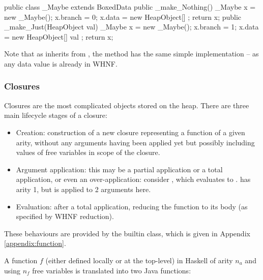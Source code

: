 \documentclass[dissertation.tex]{subfiles}
\begin{document}
{{{            \begin{javafigure}
            public class _Maybe extends BoxedData {
                public _make_Nothing() {
                    _Maybe x = new _Maybe();
                    x.branch = 0;
                    x.data = new HeapObject[] {};
                    return x;
                }
                public _make_Just(HeapObject val) {
                    _Maybe x = new _Maybe();
                    x.branch = 1;
                    x.data = new HeapObject[] { val };
                    return x;
                }
            }
            \end{javafigure}

            Note that as  inherits from , the  method has the same simple implementation -- as any data value is already in WHNF.
        }
        \subsubsection{Closures}\label{sec:closures}
        {
            Closures are the most complicated objects stored on the heap. There are three main lifecycle stages of a closure:

            \begin{itemize}
            \item
            {
                Creation: construction of a new closure representing a function of a given arity, without any arguments having been applied yet but possibly including values of free variables in scope of the closure.
            }
            \item
            {
                Argument application: this may be a partial application or a total application, or even an over-application: consider , which evaluates to .  has arity 1, but is applied to 2 arguments here.
            }
            \item
            {
                Evaluation: after a total application, reducing the function to its body (as specified by WHNF reduction).
            }
            \end{itemize}

            These behaviours are provided by the  builtin class, which is given in Appendix \ref{appendix:function}.

            A function \(f\) (either defined locally or at the top-level) in Haskell of arity \(n_a\) and using \(n_f\) free variables is translated into two Java functions:
            
}}}
\end{document}
